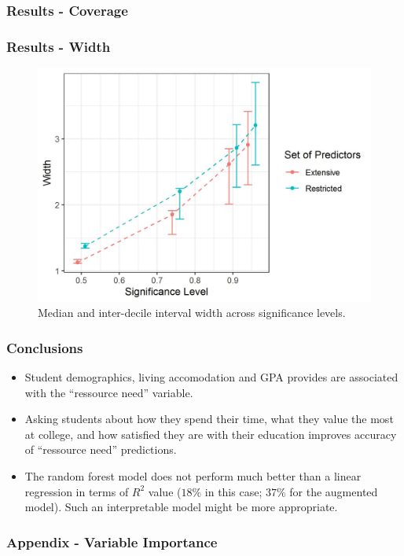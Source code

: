 \documentclass{beamer}
\begin{document}
\begin{frame} \frametitle{Results - Coverage}  

\end{frame}

\begin{frame} \frametitle{Results - Width}   
\begin{figure}
	\centering
	\includegraphics[scale = 0.5]{conformal.jpeg}
	\caption{Median and inter-decile interval width across significance levels.}
	\label{fig:conformal}
\end{figure}
\end{frame}

\begin{frame} \frametitle{Conclusions}

\begin{itemize}
	\item Student demographics, living accomodation and GPA provides are associated with the ``ressource need'' variable.
	\item Asking students about how they spend their time, what they value the most at college, and how satisfied they are with their education improves accuracy of ``ressource need'' predictions.
	\item The random forest model does not perform much better than a linear regression in terms of $R^2$ value ($18\%$ in this case; $37\%$ for the augmented model). Such an interpretable model might be more appropriate.
\end{itemize}


\end{frame}

\begin{frame} \frametitle{Appendix - Variable Importance}    

\end{frame}
\end{document}

